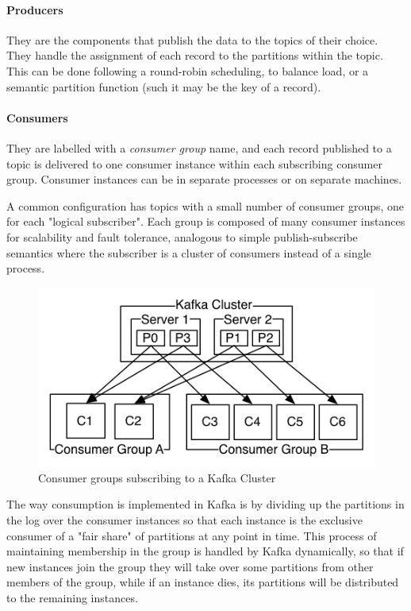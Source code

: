 \paragraph{Producers} They are the components that publish the data to the topics of their choice. They handle the assignment of each record to the partitions within the topic. This can be done following a round-robin scheduling, to balance load, or a semantic partition function (such it may be the key of a record).

\paragraph{Consumers} They are labelled with a \textit{consumer group} name, and each record published to a topic is delivered to one consumer instance within each subscribing consumer group. Consumer instances can be in separate processes or on separate machines.

A common configuration has topics with a small number of consumer groups, one for each "logical subscriber". Each group is composed of many consumer instances for scalability and fault tolerance, analogous to simple publish-subscribe semantics where the subscriber is a cluster of consumers instead of a single process.

\begin{figure}[h]
    \centering
    \includegraphics[width=0.7\linewidth]{Figures/consumer-groups}
    \caption[Consumer groups subscribing to a Kafka Cluster]{Consumer groups subscribing to a Kafka Cluster}
    \label{fig:consumer-groups}
\end{figure}


The way consumption is implemented in Kafka is by dividing up the partitions in the log over the consumer instances so that each instance is the exclusive consumer of a "fair share" of partitions at any point in time. This process of maintaining membership in the group is handled by Kafka dynamically, so that if new instances join the group they will take over some partitions from other members of the group, while if an instance dies, its partitions will be distributed to the remaining instances.

